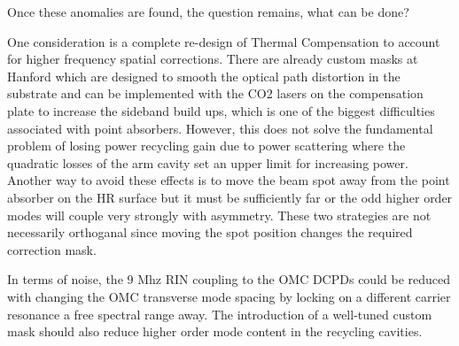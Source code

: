 	 \indent Once these anomalies are found, the question remains, what can be done?
	 
	 One consideration is a complete re-design of Thermal Compensation to account for higher frequency spatial corrections. There are already custom masks at Hanford which are designed to smooth the optical path distortion in the substrate and can be implemented with the CO2 lasers on the compensation plate to increase the sideband build ups, which is one of the biggest difficulties associated with point absorbers.  However, this does not solve the fundamental problem of losing power recycling gain due to power scattering where the quadratic losses of the arm cavity set an upper limit for increasing power.  Another way to avoid these effects is to move the beam spot away from the point absorber on the HR surface but it must be sufficiently far or the odd higher order modes will couple very strongly with asymmetry. These two strategies are not necessarily orthoganal since moving the spot position changes the required correction mask.
	 
	 In terms of noise, the 9 Mhz RIN coupling to the OMC DCPDs could be reduced with changing the OMC transverse mode spacing by locking on a different carrier resonance a free spectral range away.  The introduction of a well-tuned custom mask should also reduce higher order mode content in the recycling cavities.
	 
